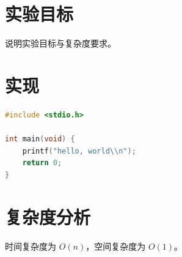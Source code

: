 \documentclass[12pt,a4paper]{scrartcl}
\begin{document}
\makecompacttitle

\section{实验目标}
说明实验目标与复杂度要求。

\section{实现}
\begin{lstlisting}[language=C]
#include <stdio.h>

int main(void) {
    printf("hello, world\\n");
    return 0;
}
\end{lstlisting}

\section{复杂度分析}
时间复杂度为 $O(n)$，空间复杂度为 $O(1)$。
\end{document}
